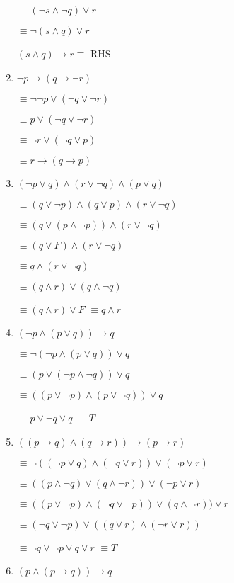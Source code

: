 \documentclass{../../cls/sig-alternate-05-2015}
\begin{document}
\begin{enumerate}
$\equiv(\neg s \wedge \neg q) \vee r $

$\equiv\neg ( s \wedge q) \vee r $

$(s \wedge q)\rightarrow r \equiv$ RHS 

\item  $\neg p \rightarrow (q \rightarrow \neg r)$

$\equiv \neg \neg p \vee (\neg q \vee \neg r)$

$\equiv  p \vee (\neg q \vee \neg r)$

$\equiv  \neg r \vee (\neg q \vee p)$

$\equiv r \rightarrow (q \rightarrow p)$

\item $(\neg p \vee q) \wedge (r \vee \neg q) \wedge (p \vee q)$

$ \equiv (q \vee \neg p)\wedge (q \vee p) \wedge (r \vee \neg q) $

$\equiv(q\vee (p \wedge \neg p)) \wedge (r \vee \neg q)$

$\equiv(q\vee F)\wedge (r \vee \neg q)$

$\equiv q \wedge (r \vee \neg q)$

$\equiv (q \wedge r )\vee( q \wedge \neg q)$

$\equiv (q\wedge r)\vee F$
$\equiv q\wedge r$

\item $(\neg p \wedge (p \vee q))\rightarrow q$

$\equiv \neg (\neg p \wedge (p \vee q))\vee q$

$\equiv  ( p \vee (\neg p \wedge \neg q))\vee q$

$\equiv  ( (p \vee \neg p) \wedge (p \vee \neg q))\vee q$

$\equiv   p \vee \neg q \vee q$ $\equiv  T$
\item $((p\rightarrow q)\wedge (q\rightarrow r)) \rightarrow (p\rightarrow r)$

$\equiv \neg ((\neg p\vee q)\wedge (\neg q\vee r)) \vee(\neg p\vee r)$

$\equiv (( p\wedge \neg q)\vee (q\wedge \neg r)) \vee(\neg p\vee r)$

$\equiv (( p\vee \neg p)\wedge (\neg q \vee \neg p))\vee (q\wedge \neg r)) \vee r$

$\equiv  (\neg q \vee \neg p)\vee ((q\vee r)\wedge (\neg r\vee r))$

$\equiv  \neg q \vee \neg p\vee q\vee r$ $\equiv T$
\item $(p\wedge (p \rightarrow q))\rightarrow q$


\end{enumerate}
\end{document}
